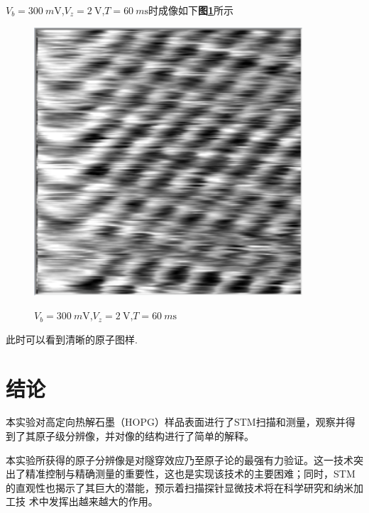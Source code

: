 \documentclass[a4paper]{article}
\begin{document}
$V_b=\SI{300}{m\volt}$,$V_z=\SI{2}{\volt}$,$T=\SI{60}{m\s}$时成像如下\textbf{图\ref{result:fig9}}所示
\begin{figure}[H]
 \centering
 \caption{$V_b=\SI{300}{m\volt}$,$V_z=\SI{2}{\volt}$,$T=\SI{60}{m\s}$}
 \includegraphics[height=10cm, width=10cm]{images/2v-300mv-60ms.png}
 \label{result:fig9}
\end{figure}
此时可以看到清晰的原子图样.
\section{结论}\label{conclusions}
本实验对高定向热解石墨（HOPG）样品表面进行了STM扫描和测量，观察并得到了其原子级分辨像，并对像的结构进行了简单的解释。
	
本实验所获得的原子分辨像是对隧穿效应乃至原子论的最强有力验证。这一技术突出了精准控制与精确测量的重要性，这也是实现该技术的主要困难；同时，STM的直观性也揭示了其巨大的潜能，预示着扫描探针显微技术将在科学研究和纳米加工技 术中发挥出越来越大的作用。

\end{document}
